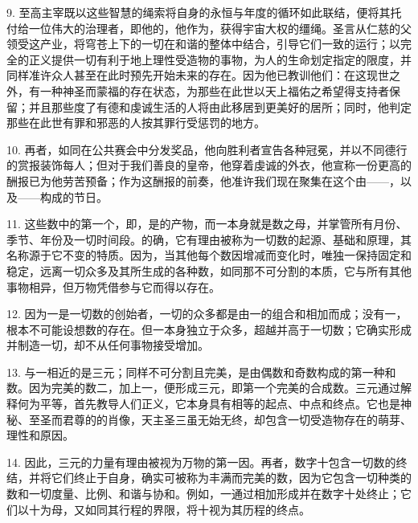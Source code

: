9. 至高主宰既以这些智慧的绳索将自身的永恒与年度的循环如此联结，便将其托付给一位伟大的治理者，即他的，他作为，获得宇宙大权的缰绳。圣言从仁慈的父领受这产业，将穹苍上下的一切在和谐的整体中结合，引导它们一致的运行；以完全的正义提供一切有利于地上理性受造物的事物，为人的生命划定指定的限度，并同样准许众人甚至在此时预先开始未来的存在。因为他已教训他们：在这现世之外，有一种神圣而蒙福的存在状态，为那些在此世以天上福佑之希望得支持者保留；并且那些度了有德和虔诚生活的人将由此移居到更美好的居所；同时，他判定那些在此世有罪和邪恶的人按其罪行受惩罚的地方。\par

10. 再者，如同在公共赛会中分发奖品，他向胜利者宣告各种冠冕，并以不同德行的赏报装饰每人；但对于我们善良的皇帝，他穿着虔诚的外衣，他宣称一份更高的酬报已为他劳苦预备；作为这酬报的前奏，他准许我们现在聚集在这个由——，以及——构成的节日。\par

11. 这些数中的第一个，即，是的产物，而一本身就是数之母，并掌管所有月份、季节、年份及一切时间段。的确，它有理由被称为一切数的起源、基础和原理，其名称源于它不变的特质。因为，当其他每个数因增减而变化时，唯独一保持固定和稳定，远离一切众多及其所生成的各种数，如同那不可分割的本质，它与所有其他事物相异，但万物凭借参与它而得以存在。\par

12. 因为一是一切数的创始者，一切的众多都是由一的组合和相加而成；没有一，根本不可能设想数的存在。但一本身独立于众多，超越并高于一切数；它确实形成并制造一切，却不从任何事物接受增加。\par

13. 与一相近的是三元；同样不可分割且完美，是由偶数和奇数构成的第一种和数。因为完美的数二，加上一，便形成三元，即第一个完美的合成数。三元通过解释何为平等，首先教导人们正义，它本身具有相等的起点、中点和终点。它也是神秘、至圣而君尊的的肖像，天主圣三虽无始无终，却包含一切受造物存在的萌芽、理性和原因。\par

14. 因此，三元的力量有理由被视为万物的第一因。再者，数字十包含一切数的终结，并将它们终止于自身，确实可被称为丰满而完美的数，因为它包含一切种类的数和一切度量、比例、和谐与协和。例如，一通过相加形成并在数字十处终止；它们以十为母，又如同其行程的界限，将十视为其历程的终点。\par


